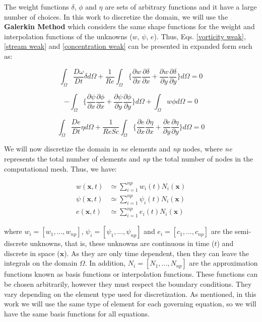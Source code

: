 The weight functions $\delta$, $\phi$ and $\eta$ 
are sets of arbitrary functions and it have a large number of choices. 
In this work to discretize the domain, we will use the 
\textbf{Galerkin Method} which considers the same shape functions 
for the weight and interpolation functions of the unknowns 
($w$, $\psi$, $e$). 
Thus, Eqs. \ref{vorticity weak}, \ref{stream weak} and
 \ref{concentration weak} 
can be presented in expanded form such as:

\begin{equation} 
   \int_{\Omega} \frac{D \omega}{Dt} \delta d\Omega 
 + \frac{1}{\textit{Re}} \int_{\Omega} \Bigg\{ \frac{\partial w}{\partial x} \frac{\partial \delta}{\partial x} 
 + \frac{\partial w}{\partial y} \frac{\partial \delta}{\partial y} \Bigg\} d\Omega 
 = 0
\end{equation}

\begin{equation}
 - \int_{\Omega} \Bigg\{ \frac{\partial \psi}{\partial x} \frac{\partial \phi}{\partial x} 
 + \frac{\partial \psi}{\partial y} \frac{\partial \phi}{\partial y} \Bigg\} d\Omega
 + \int_{\Omega} w \phi d\Omega = 0
\end{equation}

\begin{equation} 
   \int_{\Omega} \frac{D e}{Dt} \eta d\Omega 
 + \frac{1}{\textit{ReSc}} \int_{\Omega} \Bigg\{ \frac{\partial e}{\partial x} \frac{\partial \eta}{\partial x} 
 + \frac{\partial e}{\partial y} \frac{\partial \eta}{\partial y} \Bigg\} d\Omega
 = 0
\end{equation}

\medskip
We will now discretize the domain in \textit{ne} elements and 
\textit{np} nodes, where \textit{ne} represents the total number 
of elements and \textit{np} the total number of nodes 
in the computational mesh. Thus, we have:

\begin{align}
 w(\textbf{x},t) & \simeq \sum\limits_{i=1}^{np} w_i(t) N_i(\textbf{x}) \\
 \psi(\textbf{x},t) & \simeq \sum\limits_{i=1}^{np} \psi_i(t) N_i(\textbf{x}) \\
 e(\textbf{x},t) & \simeq \sum\limits_{i=1}^{np} e_i(t) N_i(\textbf{x})
\end{align}

\noindent
where 
$w_i = [w_1,...,w_{np}]$,
$\psi_i = [\psi_1,...,\psi_{np}]$ and
$e_i = [c_1,...,c_{np}]$ 
are the semi-discrete unknowns, that is, 
these unknowns are continuous in time ($t$)
and discrete in space ($\textbf{x}$). As they
are only time dependent, then 
they can leave the integrals on the domain 
$\Omega$. In addition, $N_i = [N_1, ..., N_{np}]$ 
are the approximation functions known 
as basis functions or interpolation functions. 
These functions can be chosen arbitrarily, however they 
must respect the boundary conditions. 
They vary depending on the element type used for discretization. 
As mentioned, in this work we will use the same type of element 
for each governing equation, 
so we will have the same basis functions for all equations.


